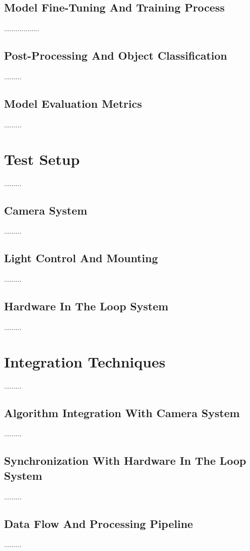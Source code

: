 \subsection{Model Fine-Tuning And Training Process}
..................
\subsection{Post-Processing And Object Classification}
.........
\subsection{Model Evaluation Metrics}
.........
\section{Test Setup}
.........
\subsection{Camera System}
.........
\subsection{Light Control And Mounting}
.........
\subsection{Hardware In The Loop System}
.........
\section{Integration Techniques}
.........
\subsection{Algorithm Integration With Camera System}
.........
\subsection{Synchronization With Hardware In The Loop System}
.........
\subsection{Data Flow And Processing Pipeline}
.........
